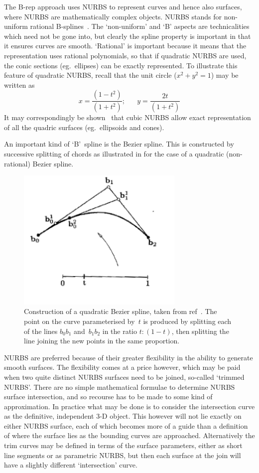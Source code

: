 The B-rep approach uses NURBS to represent curves and hence also surfaces,
where NURBS are mathematically complex objects. NURBS stands for non-uniform
rational B-splines~\cite{farin}. The `non-uniform' and `B' aspects are technicalities
which need not be gone into, but clearly the spline property is important
in that it ensures curves are smooth. `Rational' is important because it means
that the representation uses rational polynomials, so that if quadratic NURBS
are used, the conic sections (eg.\ ellipses) can be exactly represented.
To illustrate this feature of quadratic NURBS, recall that
the unit circle ($x^2+y^2=1$) may be written as
\begin{equation}
x= \frac{(1-t^2)}{(1+t^2)};\;\;\;\;\;\;
y= \frac{2t}{(1+t^2)}
\end{equation}
It may correspondingly be shown~\cite{farin} that cubic NURBS allow exact representation of all the quadric surfaces (eg.\ ellipsoids and cones).

An important kind of `B'~spline is the Bezier spline. This is constructed by
successive splitting of chords as illustrated in  for the
case of a quadratic (non-rational) Bezier spline.

\begin{figure}
\centerline{\includegraphics[width=8cm]{../png/repeatedlinear}}
\caption{Construction of a quadratic Bezier spline, taken from ref~\cite{farin}.
The point on the curve parameterised by~$t$ is produced by splitting each of the
lines $b_0 b_1$ and~$b_1 b_2$ in the ratio $t:(1-t)$, then splitting the
line joining the new points in the same proportion.
\label{fig:repeatedlinear}}
\end{figure}

NURBS are preferred because of their greater flexibility
in the ability to generate smooth surfaces.
The flexibility comes at a price however, which may be
paid when two quite distinct NURBS surfaces need to be joined, so-called
`trimmed NURBS'. There are no
simple mathematical formulae to determine NURBS surface intersection, and so recourse
has to be made to some kind of approximation. In practice what may be done
is to consider the intersection curve as the definitive, independent 3-D object.
This however will not lie exactly on either NURBS surface, each of which becomes
more of a guide than a definition of where the surface lies as the bounding
curves are approached. Alternatively the trim curves may be defined in terms of
the surface parameters, either as short line segments or as parametric NURBS, but then
each surface at the join will have a slightly different `intersection' curve.

